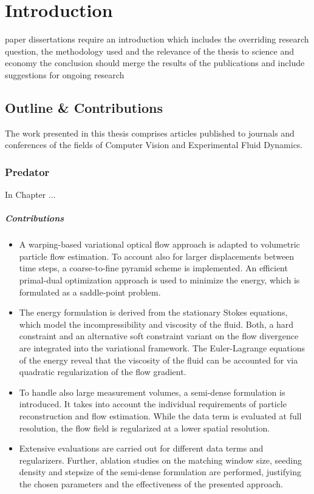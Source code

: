 \chapter{Introduction} 
paper dissertations require an introduction which includes the overriding research question, the methodology used and the relevance of the thesis to science and economy
the conclusion should merge the results of the publications and include suggestions for ongoing research


\section{Outline \& Contributions} 

The work presented in this thesis comprises articles published to journals and conferences of the fields of Computer Vision and Experimental Fluid Dynamics.


\subsection{Predator}

In Chapter ...

\paragraph{Contributions}
\begin{itemize}
\item A warping-based variational optical flow approach is adapted to volumetric particle flow estimation. To account also for larger displacements between time steps, a coarse-to-fine pyramid scheme is implemented.
An efficient primal-dual optimization approach is used to minimize the energy, which is formulated as a saddle-point problem.
\item The energy formulation is derived from the stationary Stokes equations, which model the incompressibility and viscosity of the fluid. Both, a hard constraint and an alternative soft constraint variant on the flow divergence are integrated into the variational framework. The Euler-Lagrange equations of the energy reveal that the viscosity of the fluid can be accounted for via quadratic regularization of the flow gradient. 
\item To handle also large measurement volumes, a semi-dense formulation is introduced. It takes into account the individual requirements of particle reconstruction and flow estimation. While the data term is evaluated at full resolution, the flow field is regularized at a lower spatial resolution.
\item Extensive evaluations are carried out for different data terms and regularizers. Further, ablation studies on the matching window size, seeding density and stepsize of the semi-dense formulation are performed, justifying the chosen parameters and the effectiveness of the presented approach.
\end{itemize}


